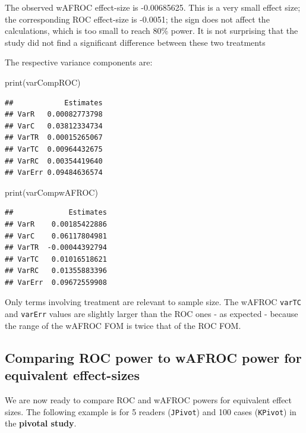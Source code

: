 \documentclass[
]{book}
\newenvironment{Shaded}{\begin{snugshade}}{\end{snugshade}}
\newcommand{\FunctionTok}[1]{\textcolor[rgb]{0.00,0.00,0.00}{#1}}
\newcommand{\NormalTok}[1]{#1}
\begin{document}
The observed wAFROC effect-size is -0.00685625. This is a very small effect size; the corresponding ROC effect-size is -0.0051; the sign does not affect the calculations, which is too small to reach 80\% power. It is not surprising that the study \citep{RN1882} did not find a significant difference between these two treatments

The respective variance components are:

\begin{Shaded}
\begin{Highlighting}[]
\FunctionTok{print}\NormalTok{(varCompROC)}
\end{Highlighting}
\end{Shaded}

\begin{verbatim}
##            Estimates
## VarR   0.00082773798
## VarC   0.03812334734
## VarTR  0.00015265067
## VarTC  0.00964432675
## VarRC  0.00354419640
## VarErr 0.09484636574
\end{verbatim}

\begin{Shaded}
\begin{Highlighting}[]
\FunctionTok{print}\NormalTok{(varCompwAFROC)}
\end{Highlighting}
\end{Shaded}

\begin{verbatim}
##             Estimates
## VarR    0.00185422886
## VarC    0.06117804981
## VarTR  -0.00044392794
## VarTC   0.01016518621
## VarRC   0.01355883396
## VarErr  0.09672559908
\end{verbatim}

Only terms involving treatment are relevant to sample size. The wAFROC \texttt{varTC} and \texttt{varErr} values are slightly larger than the ROC ones - as expected - because the range of the wAFROC FOM is twice that of the ROC FOM.

\hypertarget{comparing-roc-power-to-wafroc-power-for-equivalent-effect-sizes}{%
\subsection{Comparing ROC power to wAFROC power for equivalent effect-sizes}\label{comparing-roc-power-to-wafroc-power-for-equivalent-effect-sizes}}

We are now ready to compare ROC and wAFROC powers for equivalent effect sizes. The following example is for 5 readers (\texttt{JPivot}) and 100 cases (\texttt{KPivot}) in the \textbf{pivotal study}.
\end{document}
